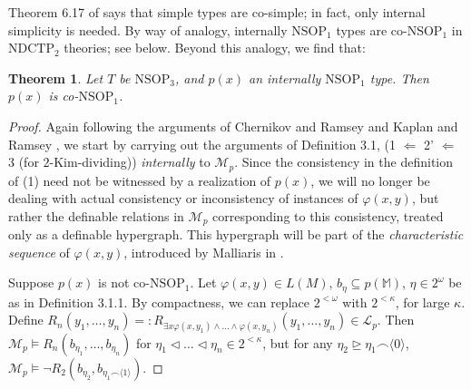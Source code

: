 \documentclass[12pt]{amsart}
\newtheorem{theorem}{Theorem}[section]
\theoremstyle{definition}
\begin{document}
Theorem 6.17 of \cite{Che14} says that simple types are co-simple; in fact, only internal simplicity is needed. By way of analogy, internally $\mathrm{NSOP}_{1}$ types are co-$\mathrm{NSOP}_{1}$ in $\mathrm{NDCTP}_{2}$ theories; see below. Beyond this analogy, we find that:

\begin{theorem}\label{3-main3}
    Let $T$ be $\mathrm{NSOP}_{3}$, and $p(x)$ an internally $\mathrm{NSOP}_{1}$ type. Then $p(x)$ is co-$\mathrm{NSOP}_{1}$.
\end{theorem}





\begin{proof}
    
Again following the arguments of Chernikov and Ramsey \cite{CR15} and Kaplan and Ramsey \cite{KR17}, we start by carrying out the arguments of Definition 3.1, (1 $\Leftarrow$ 2' $\Leftarrow$ 3 (for $2$-Kim-dividing)) \textit{internally} to $\mathcal{M}_{p}$. Since the consistency in the definition of (1) need not be witnessed by a realization of $p(x)$, we will no longer be dealing with actual consistency or inconsistency of instances of $\varphi(x, y)$, but rather the definable relations in $\mathcal{M}_{p}$ corresponding to this consistency, treated only as a definable hypergraph. This hypergraph will be part of the \textit{characteristic sequence} of $\varphi(x, y)$, introduced by Malliaris in \cite{Mal10}.

Suppose $p(x)$ is not co-$\mathrm{NSOP}_{1}$. Let $\varphi(x, y) \in L(M)$, $b_{\eta} \subseteq p(\mathbb{M})$, $\eta \in 2^{\omega}$ be as in Definition 3.1.1. By compactness, we can replace $2^{< \omega}$ with $2^{<\kappa}$, for large $\kappa$. Define $R_{n}(y_{1}, \ldots, y_{n}) =: R_{\exists x \varphi(x, y_{1}) \wedge \ldots \wedge \varphi(x, y_{n})}(y_{1}, \ldots, y_{n}) \in \mathcal{L}_{p}$. Then  $\mathcal{M}_{p} \models R_{n} (b_{\eta_{1}}, \ldots, b_{\eta_{n}}) $ for $\eta_{1} \lhd \ldots \lhd \eta_{n} \in 2^{< \kappa}$, but for any $\eta_{2} \unrhd \eta_{1} \smallfrown \langle 0\rangle$, $\mathcal{M}_{p} \models \neg R_{2}(b_{\eta_{2}}, b_{\eta_{1} \smallfrown \langle 1\rangle})$.


\end{proof}
\end{document}
